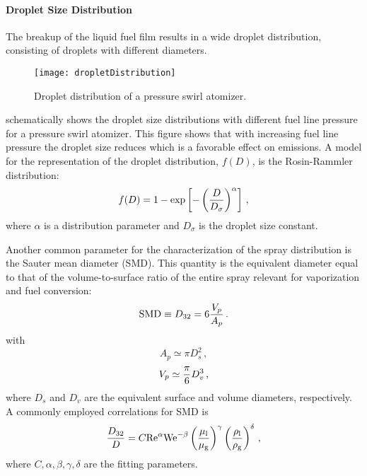 \paragraph{Droplet Size Distribution}
The breakup of the liquid fuel film results in a wide droplet distribution, consisting of droplets with different diameters.
\begin{figure}[!htb!]
 \centering
    {\texttt{[image: dropletDistribution]}}
    \caption{\label{FIG_DROPLET_DISTRIBUTION}Droplet distribution of a pressure swirl atomizer.}
\end{figure}
 schematically shows the droplet size distributions with different fuel line pressure for a pressure swirl atomizer. This figure shows that with increasing fuel line pressure the droplet size reduces which is a favorable effect on emissions. A model for the representation of the droplet distribution, $f(D)$, is the Rosin-Rammler distribution:
\begin{equation}
  f(D) = 1-\text{exp}\left[-\left({\frac{D}{D_\sigma}}\right)^\alpha\right]\,,
\end{equation}
where $\alpha$ is a distribution parameter and $D_\sigma$ is the droplet size constant.

Another common parameter for the characterization of the spray distribution is the Sauter mean diameter (SMD). This quantity is the equivalent diameter equal to that of the volume-to-surface ratio of the entire spray relevant for vaporization and fuel conversion:
\begin{equation}
  \text{SMD} \equiv D_{32} = 6 {\frac{V_p}{A_p}}\,.
\end{equation}
with 
\[
  A_p \simeq \pi D_s^2\,,
\]
\[
  V_p \simeq {\frac{\pi}{6}} D_v^3\,,
\]
where $D_s$ and $D_v$ are the equivalent surface and volume diameters, respectively. 
A commonly employed correlations for SMD is
\begin{equation}
  {\frac{D_{32}}{D}} = C \rm{Re}^\alpha \rm{We}^{-\beta} \left({\frac{\mu_l}{\mu_g}}\right)^\gamma \left({\frac{\rho_l}{\rho_g}}\right)^\delta\,,
\end{equation}
where $C, \alpha, \beta, \gamma, \delta$ are the fitting parameters.
